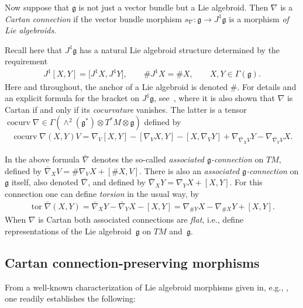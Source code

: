 \documentclass[pdftex]{sigma}
\DeclareMathOperator{\cocurvature}{cocurv}
\DeclareMathOperator{\torsion}{tor}
\numberwithin{equation}{section}
\begin{document}
Now suppose that $\mathfrak g$ is not just a vector bundle but a Lie
algebroid. Then $\nabla$ is a {\it Cartan connection} if the vector
bundle morphism $s_\nabla \colon {\mathfrak g} \rightarrow
J^1{\mathfrak g}$ is a morphism {\em of Lie algebroids}.

Recall here that $J^1 {\mathfrak g}$ has a natural Lie algebroid
structure determined by the requirement
\begin{gather*}
  J^1[X,Y]=\big[J^1 X,J^1 Y\big],\qquad \# J^1 X = \# X, \qquad X,Y\in\Gamma({\mathfrak g}).%
\end{gather*}
Here and throughout, the anchor of a Lie algebroid is denoted
$\#$. For details and an explicit formula for the bracket on $J^1
{\mathfrak g} $, see~\cite{Blaom_05}, where it is also shown that
$\nabla$ is Cartan if and only if its {\it cocurvature} vanishes. The
latter is a tensor $\cocurvature \nabla \in \Gamma(\wedge^2({\mathfrak
  g}^*)\otimes T^*\!M \otimes {\mathfrak g} )$ def\/ined by
\begin{gather*}
    \cocurvature\nabla ( X, Y)V=\nabla_V[X, Y]-[\nabla_VX,
    Y]-[X,\nabla_VY] +\nabla_{\bar\nabla_XV}Y-\nabla_{\bar\nabla_YV}X.
\end{gather*}

In the above formula $\bar\nabla$ denotes the so-called {\it
  associated ${\mathfrak g}$-connection} on $TM$, def\/ined by
$\bar\nabla_XV=\#\nabla_VX +[\#X,V]$. There is also an {\it associated
  ${\mathfrak g}$-connection} on $\mathfrak g$ itself, also denoted
$\bar\nabla$, and def\/ined by $\bar\nabla_XY=\nabla_YX+[X,Y]$. For this
connection one can def\/ine {\it torsion} in the usual way, by
\begin{gather*}
  \torsion \bar\nabla (X,Y) =
  \bar\nabla_XY-\bar\nabla_YX-[X,Y]=\nabla_{\#Y}X-\nabla_{\#X}Y+[X,Y].
\end{gather*}
When $\nabla $ is Cartan both associated connections are {\em flat},
i.e., def\/ine representations of the Lie algebroid~$\mathfrak g$ on
$TM$ and~${\mathfrak g} $.

\subsection{Cartan connection-preserving morphisms}\label{preserve}

From a well-known characterization of Lie algebroid morphisms given
in, e.g., \cite[Proposition~4.3.12]{Mackenzie_05}, one readily
establishes the following:
\end{document}
